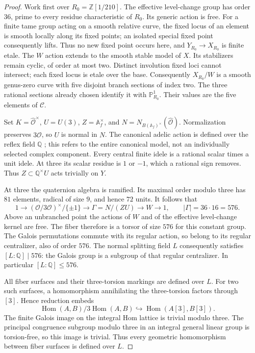 \documentclass[11pt]{article}
\theoremstyle{definition}
\theoremstyle{remark}
\begin{document}
\begin{proof}
Work first over $R_0=\mathbb Z[1/210]$. The effective level-change group
has order $36$, prime to every residue characteristic of $R_0$. Its generic
action is free. For a finite tame group acting on a smooth relative curve,
the fixed locus of an element is smooth locally along its fixed points;
an isolated special fixed point consequently lifts. Thus no new fixed
point occurs here, and $Y_{R_0}\to X_{R_0}$ is finite etale. The $W$ action
extends to the smooth stable model of $X$. Its stabilizers remain cyclic,
of order at most two. Distinct involution fixed loci cannot intersect;
each fixed locus is etale over the base. Consequently $X_{R_0}/W$ is a
smooth genus-zero curve with five disjoint branch sections of index two.
The three rational sections already chosen identify it with
$\mathbb P^1_{R_0}$. Their values are the five elements
of $\mathcal C$.

Set $K=\widehat{\mathcal O}^{\times}$, $U=U(3)$,
$Z=\mathbb A_f^\times$, and $N=N_{B(\mathbb A_f)^\times}
(\widehat{\mathcal O})$. Normalization preserves $3\widehat{\mathcal O}$,
so $U$ is normal in $N$. The canonical adelic action is defined over the
reflex field $\mathbb Q$ \cite[2.2.5 and 2.3.1]{Deligne1979}; this refers to the entire canonical model, not
an individually selected complex component. Every central finite idele
is a rational scalar times a unit idele. At three its scalar residue is
$1$ or $-1$, which a rational sign removes. Thus $Z\subset\mathbb Q^\times U$
acts trivially on $Y$.

At three the quaternion algebra is ramified. Its maximal order modulo
three has $81$ elements, radical of size $9$, and hence $72$ units.
It follows that
\[
 1\longrightarrow (\mathcal O/3\mathcal O)^\times/\{\pm1\}
 \longrightarrow\Gamma=N/(ZU)\longrightarrow W\longrightarrow1,
 \qquad |\Gamma|=36\cdot16=576.
\]
Above an unbranched point the actions of $W$ and of the effective
level-change kernel are free. The fiber therefore is a torsor of size
$576$ for this constant group. The Galois permutations commute with its
regular action, so belong to its regular centralizer, also of order
$576$. The normal splitting field $L$ consequently satisfies
$[L:\mathbb Q]\mid576$: the Galois group is a subgroup of that
regular centralizer. In particular $[L:\mathbb Q]\le576$.

All fiber surfaces and their three-torsion markings are defined over $L$.
For two such surfaces, a homomorphism annihilating the three-torsion
factors through $[3]$. Hence reduction embeds
\[
 \operatorname{Hom}(A,B)/3\operatorname{Hom}(A,B)
 \hookrightarrow\operatorname{Hom}(A[3],B[3]).
\]
The finite Galois image on the integral Hom lattice is trivial modulo
three. The principal congruence subgroup modulo three in an integral
general linear group is torsion-free, so this image is trivial. Thus
every geometric homomorphism between fiber surfaces is defined over $L$.


\end{proof}
\end{document}
